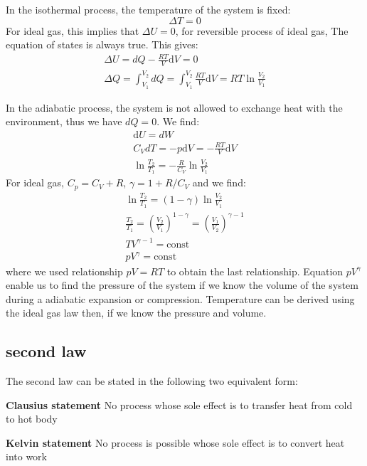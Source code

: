 \documentclass{article}
\newcommand{\dbar}{d}
\newcommand{\dnor}{\text{d}}
\begin{document}
In the isothermal process, the temperature of the system is fixed:
\begin{equation}
    \Delta T = 0
\end{equation}
For ideal gas, this implies that $\Delta U = 0$, for reversible process of ideal gas, The 
equation of states is always true. This gives:
\begin{gather}
    \Delta U = \dbar Q - \frac{RT}{V} \dnor V = 0 \\
    \Delta Q = \int_{V_1}^{V_2} \dbar Q = \int_{V_1}^{V_2} \frac{RT}{V} \dnor V = RT \ln \frac{V_2}{V_1}
\end{gather}

In the adiabatic process, the system is not allowed to exchange heat with the 
environment, thus we have $\dbar Q = 0$. We find:
\begin{gather}
    \dnor U = \dbar W \\
    C_V dT = - p \dnor V = - \frac{RT}{V} \dnor V \\
    \ln \frac{T_2}{T_1} = - \frac{R}{C_V} \ln \frac{V_2}{V_1}
\end{gather}
For ideal gas, $C_p = C_V + R$, $\gamma = 1 + R / C_V$ and we find:
\begin{gather}
    \ln \frac{T_2}{T_1} = (1-\gamma) \ln \frac{V_2}{V_1} \\
    \frac{T_2}{T_1} = \left( \frac{V_2}{V_1} \right) ^ {1-\gamma} = \left( \frac{V_1}{V_2} \right) ^ {\gamma-1} \\
    T V^{\gamma - 1} = \text{const} \\
    p V^{\gamma} = \text{const}
\end{gather}
where we used relationship $pV = RT$ to obtain the last relationship. Equation $p V^{\gamma}$ 
enable us to find the pressure of the system if we know the volume of the 
system during a adiabatic expansion or compression. Temperature can be derived using the ideal 
gas law then, if we know the pressure and volume.

\subsection*{second law}
The second law can be stated in the following two equivalent form:

\textbf{Clausius statement} No process whose sole effect is to transfer heat from cold to hot body

\textbf{Kelvin statement} No process is possible whose sole effect is to convert heat into work
\end{document}
